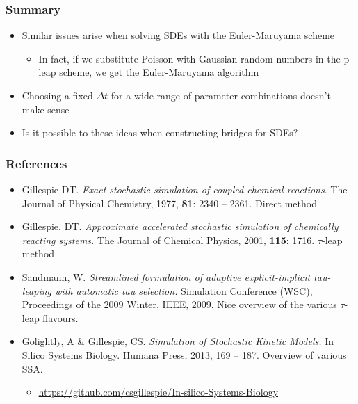 \documentclass[t,compress]{beamer}
\begin{document}
\begin{frame}
\frametitle{Summary}
\begin{itemize}
\item Similar issues arise when solving SDEs with the Euler-Maruyama scheme
\begin{itemize}
\item In fact, if we substitute Poisson with Gaussian random numbers in the
  p-leap scheme, we get the Euler-Maruyama algorithm
\end{itemize}
\item Choosing a fixed $\Delta t$ for a wide range of parameter combinations
  doesn't make sense
\item Is it possible to these ideas when constructing bridges for SDEs?
\end{itemize}
\end{frame}

\begin{frame}
\frametitle{References}
{\small
\begin{itemize}
\item Gillespie DT. \textit{Exact stochastic simulation of coupled chemical
    reactions}. The Journal of Physical Chemistry, 1977, \textbf{81}: 2340 --
  2361. \alert{Direct method}
\item Gillespie, DT. \textit{Approximate accelerated stochastic simulation of
    chemically reacting systems.} The Journal of Chemical Physics, 2001, \textbf{115}: 1716. \alert{$\tau$-leap method}
\item Sandmann, W. \textit{Streamlined formulation of adaptive explicit-implicit
    tau-leaping with automatic tau selection.} Simulation Conference (WSC),
  Proceedings of the 2009 Winter. IEEE, 2009. \alert{Nice overview of the
    various $\tau$-leap flavours.}
\item Golightly, A \& Gillespie, CS. \href{https://github.com/csgillespie/In-silico-Systems-Biology}{\textit{Simulation of Stochastic Kinetic
    Models.}} In Silico Systems Biology. Humana Press, 2013, 169 -- 187.
  \alert{Overview of various SSA.}
\begin{itemize}
\item \url{https://github.com/csgillespie/In-silico-Systems-Biology}
\end{itemize}
\end{itemize}}
\end{frame}
\end{document}
